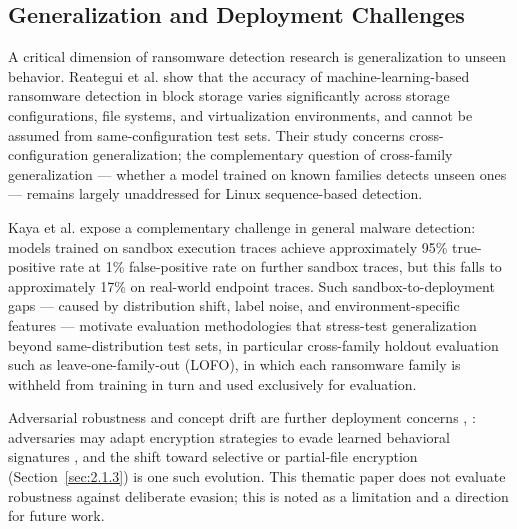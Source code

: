 \subsection{Generalization and Deployment Challenges}\label{sec:2.3.3}

A critical dimension of ransomware detection research is generalization to unseen behavior. Reategui et al. \cite{ref12} show that the accuracy of machine-learning-based ransomware detection in block storage varies significantly across storage configurations, file systems, and virtualization environments, and cannot be assumed from same-configuration test sets. Their study concerns cross-configuration generalization; the complementary question of cross-family generalization --- whether a model trained on known families detects unseen ones --- remains largely unaddressed for Linux sequence-based detection.

Kaya et al. \cite{ref15} expose a complementary challenge in general malware detection: models trained on sandbox execution traces achieve approximately 95\% true-positive rate at 1\% false-positive rate on further sandbox traces, but this falls to approximately 17\% on real-world endpoint traces. Such sandbox-to-deployment gaps --- caused by distribution shift, label noise, and environment-specific features --- motivate evaluation methodologies that stress-test generalization beyond same-distribution test sets, in particular cross-family holdout evaluation such as leave-one-family-out (LOFO), in which each ransomware family is withheld from training in turn and used exclusively for evaluation.

Adversarial robustness and concept drift are further deployment concerns \cite{ref30}, \cite{ref31}: adversaries may adapt encryption strategies to evade learned behavioral signatures \cite{ref8}, and the shift toward selective or partial-file encryption (Section~\ref{sec:2.1.3}) is one such evolution. This thematic paper does not evaluate robustness against deliberate evasion; this is noted as a limitation and a direction for future work.

